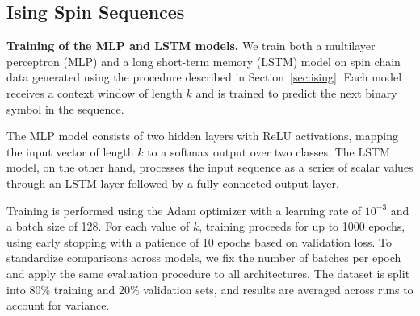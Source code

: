 \documentclass{article}
\begin{document}

\subsection{Ising Spin Sequences}
\label{sec:partC}

\textbf{Training of the MLP and LSTM models.}
We train both a multilayer perceptron (MLP) and a long short-term memory (LSTM) model on spin chain data generated using the procedure described in Section~\ref{sec:ising}. Each model receives a context window of length $k$ and is trained to predict the next binary symbol in the sequence.

The MLP model consists of two hidden layers with ReLU activations, mapping the input vector of length $k$ to a softmax output over two classes. The LSTM model, on the other hand, processes the input sequence as a series of scalar values through an LSTM layer followed by a fully connected output layer.

Training is performed using the Adam optimizer with a learning rate of $10^{-3}$ and a batch size of 128. For each value of $k$, training proceeds for up to 1000 epochs, using early stopping with a patience of 10 epochs based on validation loss. To standardize comparisons across models, we fix the number of batches per epoch and apply the same evaluation procedure to all architectures. The dataset is split into 80\% training and 20\% validation sets, and results are averaged across runs to account for variance.
\end{document}
